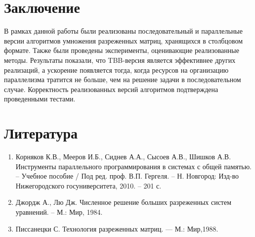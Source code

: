 \documentclass{report}
\begin{document}
\section*{Заключение}
\par В рамках данной работы были реализованы последовательный и параллельные версии алгоритмов умножения разреженных матриц, хранящихся в столбцовом формате. Также были проведены эксперименты, оценивающие реализованные методы. Результаты показали, что TBB-версия является эффективнее других реализаций, а ускорение появляется тогда, когда ресурсов на организацию параллелизма тратится не больше, чем на решение задачи в последовательном случае. Корректность реализованных версий алгоритмов подтверждена проведенными тестами.
\newpage

\section*{Литература}
\begin{enumerate}
	\item Корняков К.В., Мееров И.Б., Сиднев А.А., Сысоев А.В., Шишков А.В.
	Инструменты параллельного программирования в системах с общей
	памятью. – Учебное пособие / Под ред. проф. В.П. Гергеля. – Н. Новгород: Изд-во Нижегородского госуниверситета, 2010. – 201 с.
	\item Джордж А., Лю Дж. Численное решение больших разреженных систем уравнений. – М.: Мир, 1984.
	\item Писсанецки С. Технология разреженных матриц. — М.: Мир,1988.
\end{enumerate}
\newpage
\end{document}
